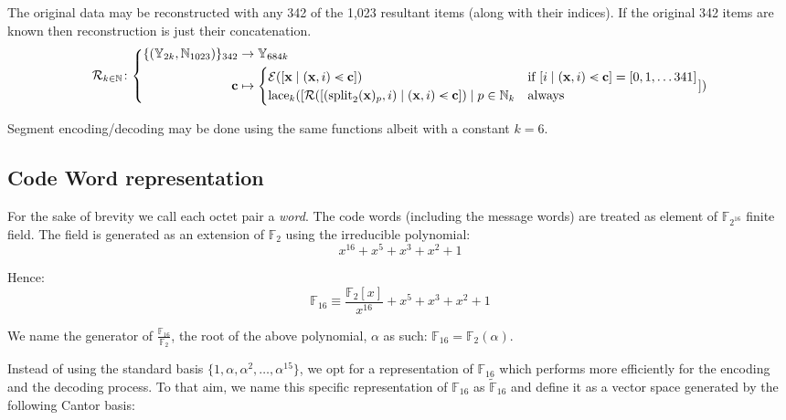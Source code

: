 The original data may be reconstructed with any 342 of the 1,023 resultant items (along with their indices). If the original 342 items are known then reconstruction is just their concatenation.
\begin{equation}\label{eq:erasurecodinginv}
  \mathcal{R}_{k \in \N}\colon\left\{\begin{aligned}
    \{(\Y_{2k}, \N_{1023})\}_{342} &\to \Y_{684k} \\
    \mathbf{c} &\mapsto \begin{cases}
      \se([\mathbf{x} \mid (\mathbf{x}, i) \orderedin \mathbf{c}]) &\when [i \mid (\mathbf{x}, i) \orderedin \mathbf{c}] = [0, 1, \dots 341]\\
      \lace_k([
        \mathcal{R}([(\spl_2(\mathbf{x})_p, i) \mid (\mathbf{x}, i) \orderedin \mathbf{c}])
      \mid p \in \N_k &\text{always}\\
    \end{cases}
    ])
  \end{aligned}\right.
\end{equation}



Segment encoding/decoding may be done using the same functions albeit with a constant $k = 6$.

\subsection{Code Word representation}

For the sake of brevity we call each octet pair a \emph{word}. The code words (including the message words) are treated as element of $\mathbb{F}_{2^{16}}$ finite field. The field is generated as an extension of $\mathbb{F}_2$ using the irreducible polynomial:
\begin{equation}
x^{16} + x^5 + x^3 + x^2 + 1
\end{equation}

Hence:
\begin{equation}
\mathbb{F}_{16} \equiv \frac{\mathbb{F}_2[x]}{x^{16}} + x^5 + x^3 + x^2 + 1
\end{equation}

We name the generator of $\frac{\mathbb{F}_{16}}{\mathbb{F}_2}$, the root of the above polynomial, $\alpha$ as such: $\mathbb{F}_{16} = \mathbb{F}_2(\alpha)$.

Instead of using the standard basis $\{1, \alpha, \alpha^2, \dots, \alpha^{15}\}$, we opt for a representation of $\mathbb{F}_{16}$ which performs more efficiently for the encoding and the decoding process. To that aim, we name this specific representation of $\mathbb{F}_{16}$ as $\tilde{\mathbb{F}}_{16}$ and define it as a vector space generated by the following Cantor basis:

